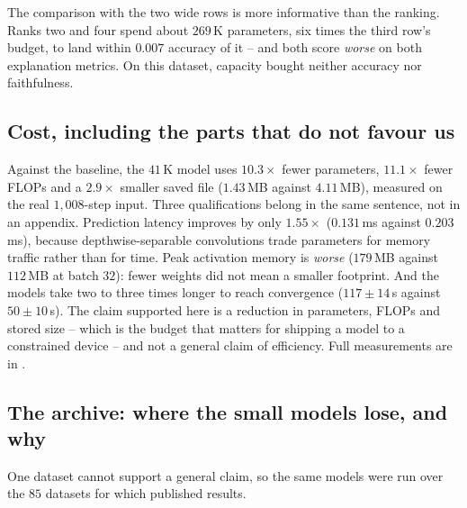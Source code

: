 The comparison with the two wide rows is more informative than the ranking. Ranks two and four spend
about $269$\,K parameters, six times the third row's budget, to land within $0.007$ accuracy of it --
and both score \emph{worse} on both explanation metrics. On this dataset, capacity bought neither
accuracy nor faithfulness.

\subsection{Cost, including the parts that do not favour us}
\label{sec:cheap:cost}

Against the baseline, the $41$\,K model uses $10.3\times$ fewer parameters, $11.1\times$ fewer FLOPs
and a $2.9\times$ smaller saved file ($1.43$\,MB against $4.11$\,MB), measured on the real
$1{,}008$-step input. Three qualifications belong in the same sentence, not in an appendix.
Prediction latency improves by only $1.55\times$ ($0.131$\,ms against $0.203$\,ms), because
depthwise-separable convolutions trade parameters for memory traffic rather than for time. Peak
activation memory is \emph{worse} ($179$\,MB against $112$\,MB at batch $32$): fewer weights did not
mean a smaller footprint. And the \seanet{} models take two to three times longer to reach
convergence ($117 \pm 14$\,s against $50 \pm 10$\,s). The claim supported here is a reduction in
parameters, FLOPs and stored size -- which is the budget that matters for shipping a model to a
constrained device -- and not a general claim of efficiency. Full measurements are in
.

\subsection{The \ucr{} archive: where the small models lose, and why}
\label{sec:cheap:ucr}

One dataset cannot support a general claim, so the same models were run over the $85$ \ucr{} datasets
for which \millet{} published results.

